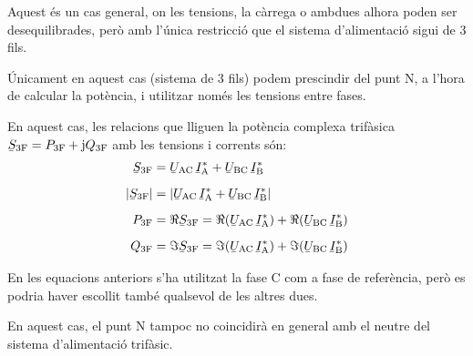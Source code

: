Aquest és un cas  general, on les tensions, la càrrega o ambdues alhora  poden ser desequilibrades, però amb l'única restricció que
el sistema d'alimentació sigui de 3 fils.

 Únicament en aquest cas (sistema de 3 fils) podem prescindir del punt N, a l'hora de
calcular la potència, i utilitzar només les tensions entre fases.

En aquest cas, les relacions que lliguen la potència complexa
trifàsica $\cmplx{S}\ped{3F} = P\ped{3F} + \ju Q\ped{3F}$ amb les
tensions i corrents són:
\begin{align}
    \cmplx{S}\ped{3F} &= \cmplx{U}\ped{AC} \,\cmplx{I}\ped{A}^*
     +  \cmplx{U}\ped{BC} \,\cmplx{I}\ped{B}^*  \label{eq:s_3f_3fils}\\[2mm]
    |\cmplx{S}\ped{3F}| &= |\cmplx{U}\ped{AC}\, \cmplx{I}\ped{A}^* +
    \cmplx{U}\ped{BC}\, \cmplx{I}\ped{B}^*| \\[2mm]
    P\ped{3F} &= \Re\cmplx{S}\ped{3F}= \Re(\cmplx{U}\ped{AC}\, \cmplx{I}\ped{A}^*) +
    \Re(\cmplx{U}\ped{BC}\, \cmplx{I}\ped{B}^*) \\[2mm]
    Q\ped{3F} &= \Im\cmplx{S}\ped{3F}=\Im(\cmplx{U}\ped{AC} \,\cmplx{I}\ped{A}^*) +
    \Im(\cmplx{U}\ped{BC} \,\cmplx{I}\ped{B}^*)
\end{align}

En les equacions anteriors s'ha utilitzat la fase C com a
fase de referència, però es podria haver escollit també qualsevol de
les altres dues.

En aquest cas, el punt N tampoc no coincidirà en general amb
el neutre del sistema d'alimentació trifàsic.


